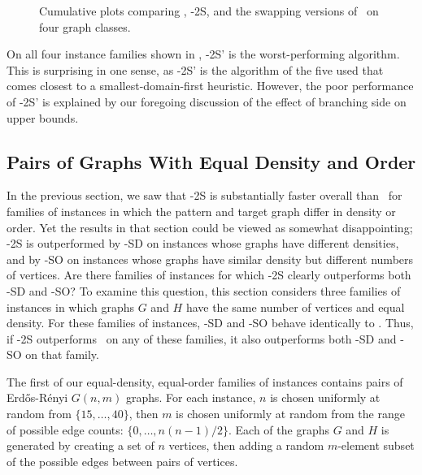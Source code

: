 \begin{figure}[htb]
{        \label{figure:mcsplit2-cumulative-random4}
    }
    \caption{Cumulative plots comparing \McSplit, \McSplit-2S, and the swapping versions of \McSplit\ on four graph classes.}
    \label{figure:mcsplit2-cumulative}
\end{figure}

On all four instance families shown in , \McSplit-2S'
is the worst-performing algorithm.  This is surprising in one sense, as \McSplit-2S' is the algorithm
of the five used that comes closest to a smallest-domain-first heuristic.  However, the poor performance
of \McSplit-2S' is explained by our foregoing discussion of the effect of branching side on upper
bounds.

\subsection{Pairs of Graphs With Equal Density and Order}

In the previous section, we saw that \McSplit-2S is substantially faster overall than \McSplit\ for families
of instances in which the pattern and target graph differ in density or order.  Yet the results in that
section could be viewed as somewhat disappointing; \McSplit-2S is outperformed by \McSplit-SD on instances
whose graphs have different densities, and by \McSplit-SO on instances whose graphs have similar density
but different numbers of vertices.  Are there families of instances for which \McSplit-2S clearly outperforms
both \McSplit-SD and \McSplit-SO?  To examine this question, this section considers three families of instances
in which graphs $G$ and $H$ have the same number of vertices and equal density.  For these families
of instances, \McSplit-SD and \McSplit-SO behave identically to
\McSplit.  Thus, if \McSplit-2S outperforms \McSplit\ on any of these families, it also
outperforms both \McSplit-SD and \McSplit-SO on that family.

The first of our equal-density, equal-order families of instances contains pairs of Erd\H{o}s-Rényi $G(n,m)$ graphs.  For each instance,
$n$ is chosen uniformly at random from $\{15, \dots, 40\}$, then $m$ is chosen
uniformly at random from the range of possible edge counts: $\{0, \dots, n(n-1)/2\}$.  Each of the graphs
$G$ and $H$ is generated by creating a set of $n$ vertices, then adding
a random $m$-element subset of the possible edges
between pairs of vertices.

